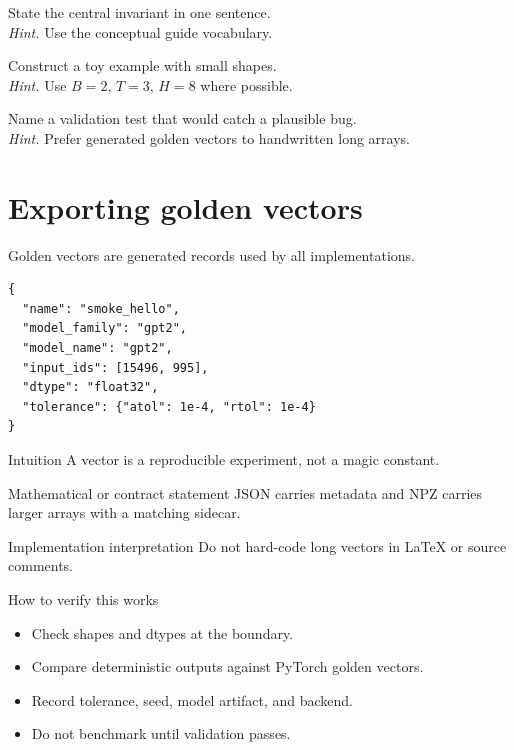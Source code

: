 \begin{chapterexercises}
\item State the central invariant in one sentence.\\
\textit{Hint.} Use the conceptual guide vocabulary.
\item Construct a toy example with small shapes.\\
\textit{Hint.} Use $B=2$, $T=3$, $H=8$ where possible.
\item Name a validation test that would catch a plausible bug.\\
\textit{Hint.} Prefer generated golden vectors to handwritten long arrays.
\end{chapterexercises}

\chapter{Exporting golden vectors}
\label{ch:golden-vectors}
Golden vectors are generated records used by all implementations.

\begin{lstlisting}[caption={Golden-vector sidecar sketch.}]
{
  "name": "smoke_hello",
  "model_family": "gpt2",
  "model_name": "gpt2",
  "input_ids": [15496, 995],
  "dtype": "float32",
  "tolerance": {"atol": 1e-4, "rtol": 1e-4}
}
\end{lstlisting}

\begin{intuitionbox}{Intuition}
A vector is a reproducible experiment, not a magic constant.
\end{intuitionbox}

\begin{definitionbox}{Mathematical or contract statement}
JSON carries metadata and NPZ carries larger arrays with a matching sidecar.
\end{definitionbox}

\begin{implementationbox}{Implementation interpretation}
Do not hard-code long vectors in LaTeX or source comments.
\end{implementationbox}

\begin{verificationbox}{How to verify this works}
\begin{itemize}
\item Check shapes and dtypes at the boundary.
\item Compare deterministic outputs against PyTorch golden vectors.
\item Record tolerance, seed, model artifact, and backend.
\item Do not benchmark until validation passes.
\end{itemize}
\end{verificationbox}


